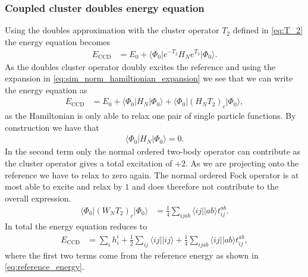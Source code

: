 \documentclass[
    a4paper, aps, twocolumn, floatfix, superscriptaddress,
    nofootinbib]{revtex4-1}
\newcommand{\1}{\mathds{1}}
\newcommand{\half}{\frac{1}{2}}
\newcommand{\bra}[1]{\langle #1\lvert}
\newcommand{\ket}[1]{\rvert #1\rangle}
\newcommand{\kslat}{\ket{\Phi_0}}
\newcommand{\bslat}{\bra{\Phi_0}}
\newcommand{\eccd}{E_{\text{CCD}}}
\begin{document}
        \subsubsection{Coupled cluster doubles energy equation}
            Using the doubles approximation with the cluster operator $T_2$
            defined in \autoref{eq:T_2} the energy equation becomes
            \begin{align}
                \eccd
                &=
                E_0
                + \bslat e^{-T_2}H_N e^{T_2}\kslat.
            \end{align}
            As the doubles cluster operator doubly excites the reference and
            using the expansion in \autoref{eq:sim_norm_hamiltionian_expansion}
            we see that we can write the energy equation as
            \begin{align}
                \eccd
                &=
                E_0
                + \bslat H_N \kslat + \bslat (H_N T_2)_c\kslat,
            \end{align}
            as the Hamiltonian is only able to relax one pair of single
            particle functions. By construction we have that
            \begin{align}
                \bslat H_N \kslat = 0.
            \end{align}
            In the second term only the normal ordered two-body operator can
            contribute as the cluster operator gives a total excitation of $+2$.
            As we are projecting onto the reference we have to relax to zero
            again. The normal ordered Fock operator is at most able to excite
            and relax by $1$ and does therefore not contribute to the
            overall expression.
            \begin{align}
                \bslat (W_N T_2)_c \kslat
                &= \frac{1}{4}\sum_{ijab}\bra{ij}\ket{ab}t_{ij}^{ab}.
            \end{align}
            In total the energy equation reduces to
            \begin{align}
                \eccd
                &= \sum_{i} h_i^i + \half \sum_{ij}\bra{ij}\ket{ij}
                + \frac{1}{4}\sum_{ijab}\bra{ij}\ket{ab}t_{ij}^{ab},
            \end{align}
            where the first two terms come from the reference energy as shown in
            \autoref{eq:reference_energy}.
\end{document}
